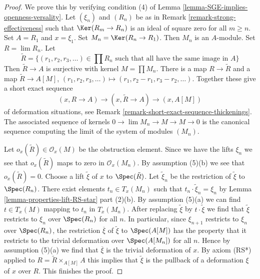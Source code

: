 \begin{proof}
We prove this by verifying condition (4) of
Lemma \ref{lemma-SGE-implies-openness-versality}.
Let $(\xi_n)$ and $(R_n)$ be as in Remark \ref{remark-strong-effectiveness}
such that $\Ker(R_m \to R_n)$ is an ideal of square zero
for all $m \geq n$. Set $A = R_1$ and $x = \xi_1$.
Set $M_n = \Ker(R_n \to R_1)$.
Then $M_n$ is an $A$-module. Set $R = \lim R_n$.
Let
$$
\tilde R = \{(r_1, r_2, r_3, \ldots) \in \prod R_n
\text{ such that all have the same image in }A\}
$$
Then $\tilde R \to A$ is surjective with kernel $M = \prod M_n$.
There is a map $R \to \tilde R$ and a map
$\tilde R \to A[M]$, $(r_1, r_2, r_3, \ldots) \mapsto
(r_1, r_2 - r_1, r_3 - r_2, \ldots)$.
Together these give a short exact sequence
$$
(x, R \to A) \to (x, \tilde R \to A) \to (x, A[M])
$$
of deformation situations, see
Remark \ref{remark-short-exact-sequence-thickenings}.
The associated sequence of kernels
$0 \to \lim M_n \to M \to M \to 0$
is the canonical sequence computing the limit
of the system of modules $(M_n)$.

\medskip\noindent
Let $o_x(\tilde R) \in \mathcal{O}_x(M)$ be the obstruction element.
Since we have the lifts $\xi_n$ we see that $o_x(\tilde R)$
maps to zero in $\mathcal{O}_x(M_n)$. By assumption (5)(b)
we see that $o_x(\tilde R) = 0$. Choose a lift $\tilde \xi$
of $x$ to $\Spec(\tilde R)$. Let $\tilde \xi_n$ be the
restriction of $\tilde \xi$ to $\Spec(R_n)$. There exist
elements $t_n \in T_x(M_n)$ such that
$t_n \cdot \tilde \xi_n = \xi_n$ by
Lemma \ref{lemma-properties-lift-RS-star} part (2)(b).
By assumption (5)(a) we can find $t \in T_x(M)$
mapping to $t_n$ in $T_x(M_n)$. After replacing
$\tilde \xi$ by $t \cdot \tilde \xi$ we find that
$\tilde \xi$ restricts to $\xi_n$ over $\Spec(R_n)$ for all $n$.
In particular, since $\xi_{n + 1}$ restricts to $\xi_n$
over $\Spec(R_n)$, the restriction $\overline{\xi}$ of $\tilde \xi$
to $\Spec(A[M])$ has the property that it restricts to
the trivial deformation over $\Spec(A[M_n])$ for all $n$.
Hence by assumption (5)(a) we find that $\overline{\xi}$
is the trivial deformation of $x$. By axiom (RS*)
applied to $R = \tilde R \times_{A[M]} A$
this implies that $\tilde \xi$ is the pullback
of a deformation $\xi$ of $x$ over $R$. This finishes the proof.
\end{proof}

